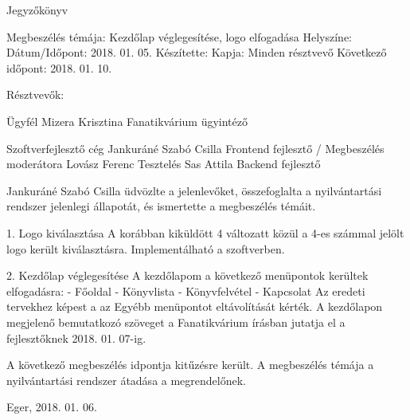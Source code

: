 Jegyzőkönyv

Megbeszélés témája: Kezdőlap véglegesítése, logo elfogadása
Helyszíne: 
Dátum/Időpont: 2018. 01. 05.
Készítette: 
Kapja: Minden résztvevő
Következő időpont: 2018. 01. 10.


Résztvevők: 

Ügyfél
Mizera Krisztina			Fanatikvárium ügyintéző

Szoftverfejlesztő cég
Jankuráné Szabó Csilla 		Frontend fejlesztő / Megbeszélés moderátora 
Lovász Ferenc				Tesztelés
Sas Attila					Backend fejlesztő 

Jankuráné Szabó Csilla üdvözlte a jelenlevőket, összefoglalta a 
nyilvántartási rendszer jelenlegi állapotát, és ismertette a 
megbeszélés témáit.

1. Logo kiválasztása
	A korábban kiküldött 4 változatt közül a 4-es számmal jelölt 
	logo került kiválasztásra. Implementálható a szoftverben. 

2. Kezdőlap véglegesítése
	A kezdőlapom a következő menüpontok kerültek elfogadásra: 
		- Főoldal
		- Könyvlista
		- Könyvfelvétel
		- Kapcsolat
	Az eredeti tervekhez képest a az Egyébb menüpontot eltávolítását kérték. 
	A kezdőlapon megjelenő bemutatkozó szöveget a Fanatikvárium írásban jutatja 
	el a fejlesztőknek 2018. 01. 07-ig. 
	
A következő megbeszélés idpontja kitűzésre került. A megbeszélés témája
a nyilvántartási rendszer átadása a megrendelőnek. 
	
Eger, 2018. 01. 06.